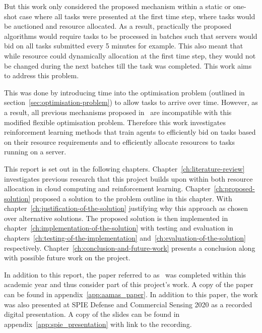 But this work only considered the proposed mechanism within a static or one-shot case where all tasks were presented
at the first time step, where tasks would be auctioned and resource allocated. As a result, practically the proposed
algorithms would require tasks to be processed in batches such that servers would bid on all tasks submitted every 5
minutes for example. This also meant that while resource could dynamically allocation at the first time step, they
would not be changed during the next batches till the task was completed. This work aims to address this problem.

This was done by introducing time into the optimisation problem (outlined in section~\ref{sec:optimisation-problem})
to allow tasks to arrive over time. However, as a result, all previous mechanisms proposed
in~\cite{FlexibleResourceAllocation} are incompatible with this modified flexible optimisation problem. Therefore this
work investigates reinforcement learning methods that train agents to efficiently bid on tasks based on their resource
requirements and to efficiently allocate resources to tasks running on a server.

This report is set out in the following chapters. Chapter~\ref{ch:literature-review} investigates previous research
that this project builds upon within both resource allocation in cloud computing and reinforcement learning.
Chapter~\ref{ch:proposed-solution} proposed a solution to the problem outline in this chapter.
With chapter~\ref{ch:justification-of-the-solution} justifying why this approach as chosen over alternative solutions.
The proposed solution is then implemented in chapter~\ref{ch:implementation-of-the-solution} with testing and
evaluation in chapters~\ref{ch:testing-of-the-implementation} and~\ref{ch:evaluation-of-the-solution} respectively.
Chapter~\ref{ch:conclusion-and-future-work} presents a conclusion along with possible future work on the project.

In addition to this report, the paper referred to as~\cite{FlexibleResourceAllocation} was completed within this
academic year and thus consider part of this project's work. A copy of the paper can be found in
appendix~\ref{app:aamas_paper}. In addition to this paper, the work was also presented at SPIE Defense and Commercial
Sensing 2020 as a recorded digital presentation. A copy of the slides can be found in
appendix~\ref{app:spie_presentation} with link to the recording.

